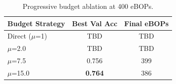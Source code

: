 \begin{table}[t]
\centering
\caption{Progressive budget ablation at 400 eBOPs.}
\label{tab:budget_ablation}
\begin{tabular}{lcc}
\toprule
Budget Strategy & Best Val Acc & Final eBOPs \\
\midrule
Direct ($\mu$=1) & TBD & TBD \\
$\mu$=2.0 & TBD & TBD \\
$\mu$=7.5 & 0.756 & 399 \\
$\mu$=15.0 & \textbf{0.764} & 386 \\
\bottomrule
\end{tabular}
\end{table}